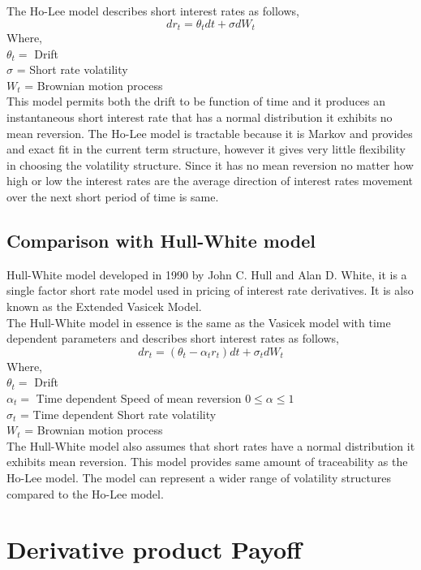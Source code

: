 \documentclass{article}
\begin{document}
The Ho-Lee  model describes short interest rates as follows,
 \[
dr_t = \theta_t dt + \sigma  dW_t
\]
Where,\\
$\theta_t =$ Drift  \\
$\sigma$ = Short rate volatility \\
$W_t$ = Brownian motion process  \\

This model permits both the drift to be function of time and it produces an instantaneous short interest rate that has a normal distribution it exhibits no mean reversion.  The Ho-Lee model is tractable because it is Markov and provides and exact fit in the current term structure, however it gives very little flexibility in choosing the volatility structure.  Since it has no mean reversion no matter how high or low the interest rates are the average direction of interest rates movement over the next short period of time is same.

\subsection{Comparison with Hull-White model
}
Hull-White model developed in 1990 \cite{HW1} by John C. Hull and Alan D. White, it is a single factor short rate model used in pricing of interest rate derivatives.  It is also known as the Extended Vasicek Model.\\

The Hull-White model in essence is the same as the Vasicek model with time dependent parameters and describes short interest rates as follows,
 \[
dr_t = (\theta_t - \alpha_t r_t) dt + \sigma_t  dW_t
\]
Where,\\
$\theta_t =$ Drift  \\
$\alpha_t =$ Time dependent Speed of mean reversion $0 \leq \alpha \leq 1 $ \\
$\sigma_t$ = Time dependent Short rate volatility \\
$W_t$ = Brownian motion process  \\

The Hull-White model also assumes that short rates have a normal distribution it exhibits mean reversion.  This model provides same amount of traceability as the Ho-Lee model.  The model can represent a wider range of volatility structures compared to the Ho-Lee model.
\section{Derivative product Payoff}
\end{document}
